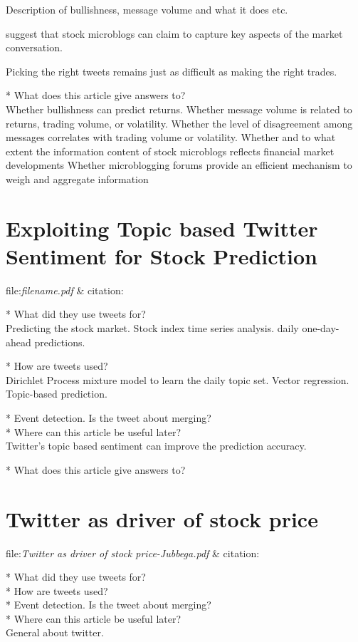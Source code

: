 Description of bullishness, message volume and what it does etc. 

\cite[p52]{sprenger10} suggest that stock microblogs can claim to capture key aspects of the market
conversation.

Picking the right tweets remains just as difficult as making the
right trades.

* What does this article give answers to?\\
Whether bullishness can predict returns.
Whether message volume is related to returns, trading volume, or volatility.
Whether the level of disagreement among messages correlates with trading volume
or volatility.
Whether and to what extent the information content of stock microblogs reflects financial market developments
Whether microblogging forums provide an efficient mechanism to weigh and aggregate information


\section{Exploiting Topic based Twitter Sentiment for Stock Prediction}
file:\textit{filename.pdf} & citation:\cite[]{mukherjee13}  

* What did they use tweets for?\\
Predicting the stock market. 
Stock index time series analysis. 
daily one-day-ahead predictions. 

* How are tweets used?\\
Dirichlet Process mixture model to learn the daily topic set.
Vector regression. 
Topic-based prediction. 

* Event detection. Is the tweet about merging? \\
* Where can this article be useful later? \\
Twitter’s topic based sentiment can improve the prediction accuracy.
\cite[p28]{mukherjee13}

* What does this article give answers to?\\

\section{Twitter as driver of stock price}
file:\textit{Twitter as driver of stock price-Jubbega.pdf} &
citation:\cite[]{annikajubbega11:twitter_driver_stock_price}

* What did they use tweets for?\\
* How are tweets used?\\
* Event detection. Is the tweet about merging? \\
* Where can this article be useful later? \\
General about twitter.
 
